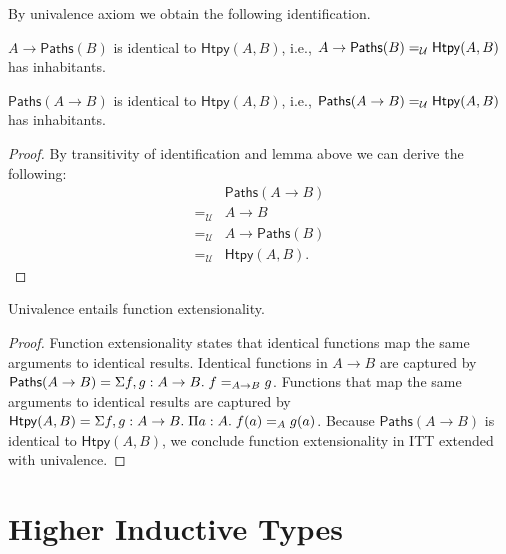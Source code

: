 \documentclass{article}
\newcommand{\calU}{\mathcal{U}}
\begin{document}
By univalence axiom we obtain the following identification.

\begin{corollary}
	$A \to \mathsf{Paths}(B)$ is identical to $\mathsf{Htpy}(A,B)$, i.e., 
	$\Ideq{\calU}{A \to \mathsf{Paths}(B)}{\mathsf{Htpy}(A,B)}$ has 
	inhabitants.
\end{corollary}

\begin{lemma}
	$\mathsf{Paths}(A \to B)$ is identical to $\mathsf{Htpy}(A,B)$, i.e., 
	$\Ideq{\calU}{\mathsf{Paths}(A \to B)}{\mathsf{Htpy}(A,B)}$ has 
	inhabitants.
\end{lemma}
\begin{proof}
	By transitivity of identification and lemma above we can derive the following:
	\[
	\begin{array}{cl}
	& \mathsf{Paths}(A \to B) \\
	=_{\calU} & A \to B \\
	=_{\calU} & A \to \mathsf{Paths}(B) \\
	=_{\calU} & \mathsf{Htpy}(A,B).
	\end{array}
	\]
\end{proof}

\begin{corollary}
	Univalence entails function extensionality.
\end{corollary}
\begin{proof}
	Function extensionality states that identical functions map the same 
	arguments to identical results.
	Identical functions in $A \to B$ are captured by $\mathsf{Paths}(A\to B) = 
	\hsigtype{f,g}{A\to B}{ \Ideq{A \to B}{f}{g} }$.
	Functions that map the same arguments to identical results are captured  by 
	$\mathsf{Htpy}(A,B) = \hsigtype{f,g}{A \to B}{ \hpitype{a}{A}{ 
	\Ideq{A}{f(a)}{g(a)} } }$.
	Because $\mathsf{Paths}(A \to B)$ is identical to $\mathsf{Htpy}(A,B)$, we 
	conclude function extensionality in ITT extended with univalence.
\end{proof}

\section{Higher Inductive Types}

\renewcommand{\natrecop}{\mathsf{natrec}}
\end{document}
